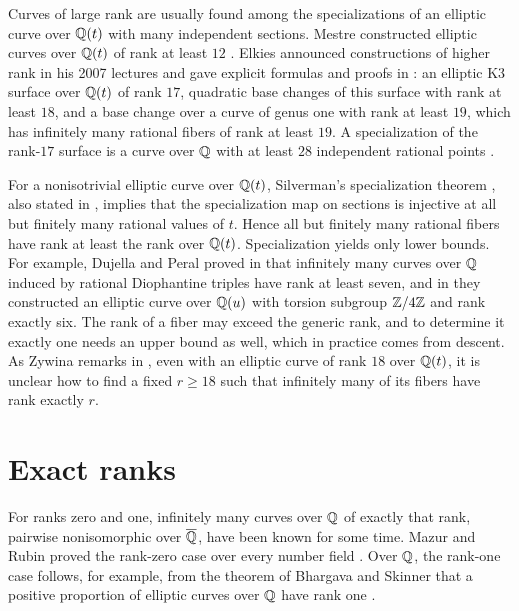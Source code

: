 Curves of large rank are usually found among the specializations of an elliptic curve over $\mathbb Q(t)$ with many independent sections. Mestre constructed elliptic curves over $\mathbb Q(t)$ of rank at least $12$ \cite{Mestre1991}. Elkies announced constructions of higher rank in his 2007 lectures \cite{Elkies2007} and gave explicit formulas and proofs in \cite[Theorems~1--3]{Elkies2026}: an elliptic K3 surface over $\mathbb Q(t)$ of rank $17$, quadratic base changes of this surface with rank at least $18$, and a base change over a curve of genus one with rank at least $19$, which has infinitely many rational fibers of rank at least $19$. A specialization of the rank-$17$ surface is a curve over $\mathbb Q$ with at least $28$ independent rational points \cite[Theorem~2]{Elkies2026}.

For a nonisotrivial elliptic curve over $\mathbb Q(t)$, Silverman's specialization theorem \cite[Theorem~C, p.~208]{Silverman1983}, also stated in \cite[Theorem~C.20.3]{SilvermanAEC}, implies that the specialization map on sections is injective at all but finitely many rational values of $t$. Hence all but finitely many rational fibers have rank at least the rank over $\mathbb Q(t)$. Specialization yields only lower bounds. For example, Dujella and Peral proved in \cite[\S3]{DujellaPeral2020} that infinitely many curves over $\mathbb Q$ induced by rational Diophantine triples have rank at least seven, and in \cite[\S4]{DujellaPeral2024} they constructed an elliptic curve over $\mathbb Q(u)$ with torsion subgroup $\mathbb Z/4\mathbb Z$ and rank exactly six. The rank of a fiber may exceed the generic rank, and to determine it exactly one needs an upper bound as well, which in practice comes from descent. As Zywina remarks in \cite[\S1]{Zywina2026}, even with an elliptic curve of rank $18$ over $\mathbb Q(t)$, it is unclear how to find a fixed $r\ge 18$ such that infinitely many of its fibers have rank exactly $r$.

\section{Exact ranks}\label{sec:intro-exact}

For ranks zero and one, infinitely many curves over $\mathbb Q$ of exactly that rank, pairwise nonisomorphic over $\overline{\mathbb Q}$, have been known for some time. Mazur and Rubin proved the rank-zero case over every number field \cite[Corollary~1.11 and proof of Lemma~5.4]{MazurRubin2010}. Over $\mathbb Q$, the rank-one case follows, for example, from the theorem of Bhargava and Skinner that a positive proportion of elliptic curves over $\mathbb Q$ have rank one \cite{BhargavaSkinner2014}.

